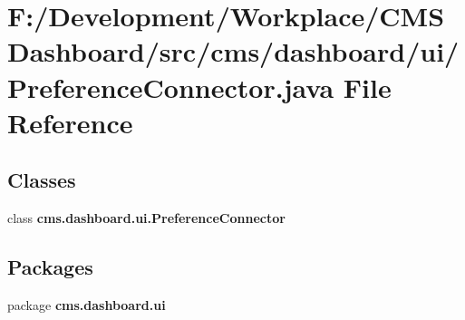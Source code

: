 \section{\-F\-:/\-Development/\-Workplace/\-C\-M\-S \-Dashboard/src/cms/dashboard/ui/\-Preference\-Connector.java \-File \-Reference}
\label{_preference_connector_8java}
\subsection*{\-Classes}
\begin{DoxyCompactItemize}
\item 
class {\bf cms.\-dashboard.\-ui.\-Preference\-Connector}
\end{DoxyCompactItemize}
\subsection*{\-Packages}
\begin{DoxyCompactItemize}
\item 
package {\bf cms.\-dashboard.\-ui}
\end{DoxyCompactItemize}
